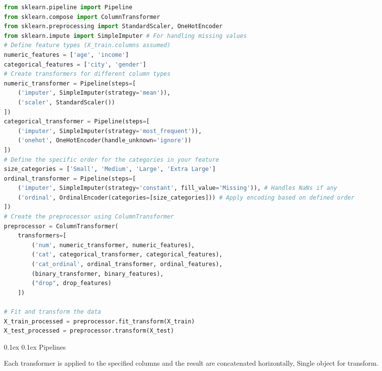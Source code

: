 \documentclass[8pt,landscape]{article}
\makeatletter
\renewcommand{\subsection}{\@startsection{subsection}{2}{0pt}%
    {0.1ex}%
    {0.1ex}%
    {\fontsize{8}{9}\bfseries\color{blue}}} %
\newcommand{\smalltext}[1]{%
  {\fontsize{8}{9}\selectfont\sloppy #1\par}%
}
\makeatother
\begin{document}
\begin{multicols}{3}
\begin{lstlisting}[language=Python]
from sklearn.pipeline import Pipeline
from sklearn.compose import ColumnTransformer
from sklearn.preprocessing import StandardScaler, OneHotEncoder
from sklearn.impute import SimpleImputer # For handling missing values
# Define feature types (X_train.columns assumed)
numeric_features = ['age', 'income']
categorical_features = ['city', 'gender']
# Create transformers for different column types
numeric_transformer = Pipeline(steps=[
    ('imputer', SimpleImputer(strategy='mean')),
    ('scaler', StandardScaler())
])
categorical_transformer = Pipeline(steps=[
    ('imputer', SimpleImputer(strategy='most_frequent')),
    ('onehot', OneHotEncoder(handle_unknown='ignore'))
])
# Define the specific order for the categories in your feature
size_categories = ['Small', 'Medium', 'Large', 'Extra Large']
ordinal_transformer = Pipeline(steps=[
    ('imputer', SimpleImputer(strategy='constant', fill_value='Missing')), # Handles NaNs if any
    ('ordinal', OrdinalEncoder(categories=[size_categories])) # Apply encoding based on defined order
])
# Create the preprocessor using ColumnTransformer
preprocessor = ColumnTransformer(
    transformers=[
        ('num', numeric_transformer, numeric_features),
        ('cat', categorical_transformer, categorical_features),
        ('cat_ordinal', ordinal_transformer, ordinal_features),
        (binary_transformer, binary_features),
        ("drop", drop_features)
    ])

# Fit and transform the data
X_train_processed = preprocessor.fit_transform(X_train)
X_test_processed = preprocessor.transform(X_test)
\end{lstlisting}

\subsection{Pipelines}
\smalltext{
Each transformer is applied to the specified columns and the result are concatenated horizontally, Single object for transform.
}

\end{multicols}
\end{document}
